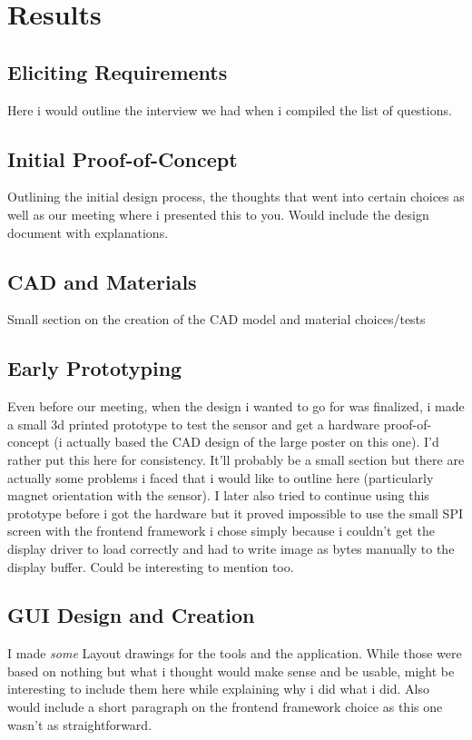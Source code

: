 \chapter{Results}
\label{sec:results}
\section{Eliciting Requirements}
Here i would outline the interview we had when i compiled the list of questions.
\section{Initial Proof-of-Concept}
Outlining the initial design process, the thoughts that went into certain choices as well as our meeting where i presented this to you. Would include the design document with explanations.
\section{CAD and Materials}
Small section on the creation of the CAD model and material choices/tests
\section{Early Prototyping}
Even before our meeting, when the design i wanted to go for was finalized, i made a small 3d printed prototype to test the sensor and get a hardware proof-of-concept (i actually based the CAD design of the large poster on this one). I'd rather put this here for consistency. It'll probably be a small section but there are actually some problems i faced that i would like to outline here (particularly magnet orientation with the sensor). I later also tried to continue using this prototype before i got the hardware but it proved impossible to use the small SPI screen with the frontend framework i chose simply because i couldn't get the display driver to load correctly and had to write image as bytes manually to the display buffer. Could be interesting to mention too.
\section{GUI Design and Creation}
I made \textit{some} Layout drawings for the tools and the application. While those were based on nothing but what i thought would make sense and be usable, might be interesting to include them here while explaining why i did what i did.
Also would include a short paragraph on the frontend framework choice as this one wasn't as straightforward.

